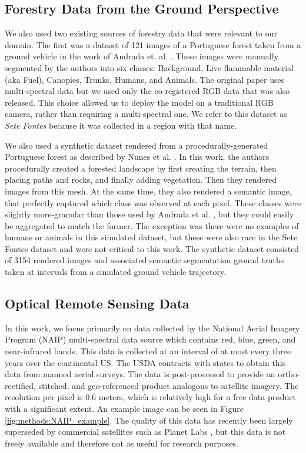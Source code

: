 \subsection{Forestry Data from the Ground Perspective}
We also used two existing sources of forestry data that were relevant to our domain. The first was a dataset of 121 images of a Portuguese forest taken from a ground vehicle in the work of Andrada et. al. \cite{Andrada2020}. These images were manually segmented by the authors into six classes: Background, Live flammable material (aka Fuel), Canopies, Trunks, Humans, and Animals. The original paper uses multi-spectral data but we used only the co-registered RGB data that was also released. This choice allowed us to deploy the model on a traditional RGB camera, rather than requiring a multi-spectral one. We refer to this dataset as \textit{Sete Fontes} because it was collected in a region with that name.

We also used a synthetic dataset rendered from a procedurally-generated Portuguese forest as described by Nunes et al. \cite{nunes2021procedural}. In this work, the authors procedurally created a forested landscape by first creating the terrain, then placing paths and rocks, and finally adding vegetation. Then they rendered images from this mesh. At the same time, they also rendered a semantic image, that perfectly captured which class was observed at each pixel. These classes were slightly more-granular than those used by Andrada et al. \cite{Andrada2020}, but they could easily be aggregated to match the former. The exception was there were no examples of humans or animals in this simulated dataset, but these were also rare in the Sete Fontes dataset and were not critical to this work. The synthetic dataset consisted of 3154 rendered images and associated semantic segmentation ground truths taken at intervals from a simulated ground vehicle trajectory. 

\subsection{Optical Remote Sensing Data}
In this work, we focus primarily on data collected by the National Aerial Imagery Program (NAIP) multi-spectral data source which contains red, blue, green, and near-infrared bands. This data is collected at an interval of at most every three years over the continental US. The USDA contracts with states to obtain this data from manned aerial surveys. The data is post-processed to provide an ortho-rectified, stitched, and geo-referenced product analogous to satellite imagery. The resolution per pixel is 0.6 meters, which is relatively high for a free data product with a significant extent. An example image can be seen in Figure \ref{fig:methods:NAIP_example}. The quality of this data has recently been largely superseded by commercial satellites such as Planet Labs \cite{Planet}, but this data is not freely available and therefore not as useful for research purposes. 

